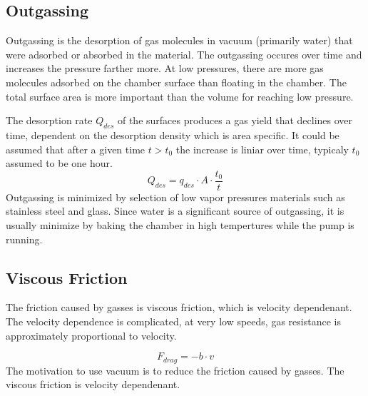 \documentclass[\main/master.tex]{subfiles}
\begin{document}
\subsection{Outgassing}
Outgassing is the desorption of gas molecules in vacuum (primarily water)  that were adsorbed or absorbed in the material. The outgassing occures over time and increases the pressure farther more. At low pressures, there are more gas molecules adsorbed on the chamber surface than floating in the chamber. The total surface area is more important than the volume for reaching low pressure. 
\par
The desorption rate $Q_{des}$ of the surfaces produces a gas yield that declines over time, dependent on the desorption density which is area specific. It could be assumed that after a given time $t>t_0$ the increase is liniar over time, typicaly $t_0$ assumed to be one hour.
\begin{equation}
Q_{des} = q_{des}\cdot A\cdot\frac{t_0}{t}  \label{eqn:energy-mass-equivalence-relation}
\end{equation}
Outgassing is minimized by selection of low vapor pressures materials such as stainless steel and glass. Since water is a significant source of outgassing, it is usually minimize by baking the chamber in high tempertures while the pump is running.


\subsection{Viscous Friction}
The friction caused by gasses is viscous friction, which is velocity dependenant. The velocity dependence is complicated, at very low speeds, gas resistance is approximately proportional to velocity. 

\begin{equation}
F_{drag} = -b\cdot v  \label{eqn:energy-mass-equivalence-relation}
\end{equation}
The motivation to use vacuum is to reduce the friction caused by gasses. The viscous friction is velocity dependenant.
\end{document}
